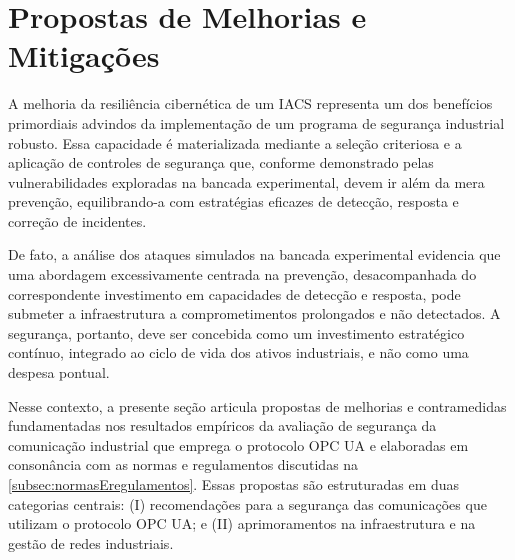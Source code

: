 \section{Propostas de Melhorias e Mitigações} \label{sec:melhorias-mitigacoes}

    A melhoria da resiliência cibernética de um IACS representa um dos benefícios primordiais advindos da implementação de um programa de segurança industrial robusto. Essa capacidade é materializada mediante a seleção criteriosa e a aplicação de controles de segurança que, conforme demonstrado pelas vulnerabilidades exploradas na bancada experimental, devem ir além da mera prevenção, equilibrando-a com estratégias eficazes de detecção, resposta e correção de incidentes.

    De fato, a análise dos ataques simulados na bancada experimental evidencia que uma abordagem excessivamente centrada na prevenção, desacompanhada do correspondente investimento em capacidades de detecção e resposta, pode submeter a infraestrutura a comprometimentos prolongados e não detectados. A segurança, portanto, deve ser concebida como um investimento estratégico contínuo, integrado ao ciclo de vida dos ativos industriais, e não como uma despesa pontual.

    Nesse contexto, a presente seção articula propostas de melhorias e contramedidas fundamentadas nos resultados empíricos da avaliação de segurança da comunicação industrial que emprega o protocolo OPC UA e elaboradas em consonância com as normas e regulamentos discutidas na \autoref{subsec:normasEregulamentos}. Essas propostas são estruturadas em duas categorias centrais: (I) recomendações para a segurança das comunicações que utilizam o protocolo OPC UA; e (II) aprimoramentos na infraestrutura e na gestão de redes industriais. %


